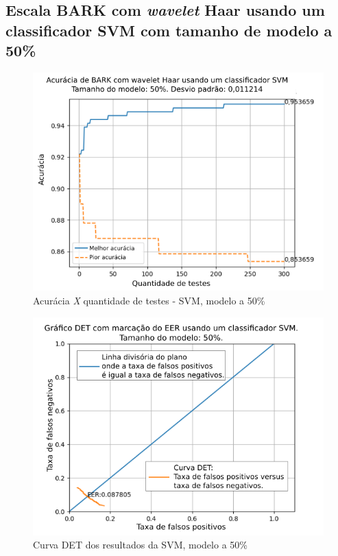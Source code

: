 \subsection{Escala BARK com \textit{wavelet} Haar usando um classificador SVM com tamanho de modelo a 50\%}



\begin{figure}[!h]
	\centering
	\includegraphics[width=\linewidth]{images/results/confusionMatrices/classifier_SVM_50.png}
	\caption{Acurácia \textit{X} quantidade de testes - SVM, modelo a 50\%}
	\label{fig:classifiersvm50}
\end{figure}

\begin{figure}[!h]
	\centering
	\includegraphics[width=.9\linewidth]{images/results/det/DET_SVM_50}
	\caption{Curva DET dos resultados da SVM, modelo a 50\%}
	\label{fig:detsvm50}
\end{figure}

